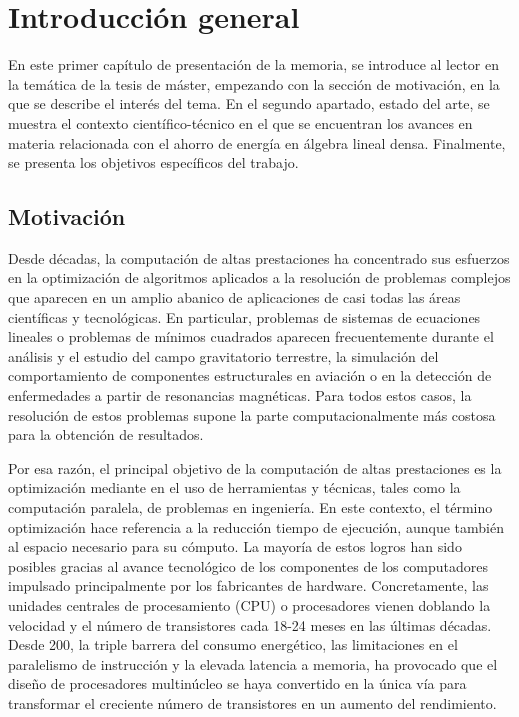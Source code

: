 
\chapter{Introducción general\label{capIntroduccion}}

En este primer capítulo de presentación de la memoria, se 
introduce al lector en la temática de la tesis de máster, empezando con la sección de 
motivación, en la que se des\-cri\-be el interés del tema. En el segundo 
apartado, estado del arte, se muestra el contexto científico-técnico 
en el que se encuentran los avances en materia relacionada con el ahorro de 
energía en álgebra lineal densa. Finalmente, se presenta los ob\-je\-ti\-vos 
específicos del trabajo.

\section{Motivación}

Desde décadas, la computación de altas prestaciones ha concentrado sus 
esfuerzos en la optimización de algoritmos aplicados a la resolución de 
problemas complejos que aparecen en un amplio abanico de aplicaciones de casi 
todas las áreas científicas y tecnológicas. En particular, problemas de sistemas 
de ecuaciones lineales o problemas de mínimos cuadrados aparecen frecuentemente 
durante el análisis y el estudio del campo gravitatorio terrestre, la simulación 
del comportamiento de componentes estructurales en aviación o en la detección de 
enfermedades a partir de resonancias magnéticas. Para todos estos casos, la 
resolución de estos problemas supone la parte computacionalmente más costosa 
para la obtención de resultados.

Por esa razón, el principal objetivo de la computación de 
altas prestaciones es la optimización mediante en el uso de herramientas y 
técnicas, tales como la computación paralela, de problemas en ingeniería. En 
este contexto, el término optimización hace referencia a la reducción 
tiempo de ejecución, aunque también  al espacio necesario para su cómputo. La 
mayoría de estos logros han sido posibles gracias al avance tecnológico de los 
componentes de los computadores impulsado principalmente por los fabricantes de 
hardware. Concretamente, las unidades centrales de procesamiento (CPU) o 
procesadores vienen doblando la velocidad y el número de transistores cada 18-24 
meses en las últimas décadas. Desde 200, la triple barrera del consumo energético,
las limitaciones en el paralelismo de instrucción y la elevada latencia a memoria,
ha provocado que el diseño de procesadores multinúcleo se haya convertido en la 
única vía para transformar el creciente número de transistores en un aumento
del rendimiento.

